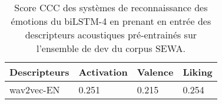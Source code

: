 \begin{table}[h]
  \centering
  \begin{tabular}{|l|l|l|l|}
  \hline
  Descripteurs   &Activation   &Valence  &Liking  \\
  \hline
  wav2vec-EN      &0.251      &0.215      &0.254 \\
  \hline
\end{tabular}
\caption{Score CCC des systèmes de reconnaissance des émotions du biLSTM-4 en prenant en entrée des descripteurs acoustiques pré-entrainés sur l'ensemble de dev du corpus SEWA.}
\label{tab:sewa_wav2vec}
\end{table}
